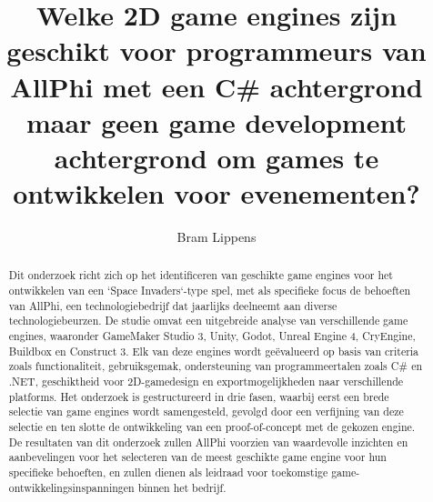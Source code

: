 \documentclass{hogent-article}
\title{Welke 2D game engines zijn geschikt voor programmeurs van AllPhi met een C\# achtergrond maar geen game development achtergrond om games te ontwikkelen voor evenementen?}
\author{Bram Lippens}
\begin{document}
\begin{abstract}
  Dit onderzoek richt zich op het identificeren van geschikte game engines voor het ontwikkelen van een `Space Invaders`-type spel, met als specifieke focus de behoeften van AllPhi, een technologiebedrijf dat jaarlijks deelneemt aan diverse technologiebeurzen. De studie omvat een uitgebreide analyse van verschillende game engines, waaronder GameMaker Studio 3, Unity, Godot, Unreal Engine 4, CryEngine, Buildbox en Construct 3. Elk van deze engines wordt geëvalueerd op basis van criteria zoals functionaliteit, gebruiksgemak, ondersteuning van programmeertalen zoals C\# en .NET, geschiktheid voor 2D-gamedesign en exportmogelijkheden naar verschillende platforms. Het onderzoek is gestructureerd in drie fasen, waarbij eerst een brede selectie van game engines wordt samengesteld, gevolgd door een verfijning van deze selectie en ten slotte de ontwikkeling van een proof-of-concept met de gekozen engine. De resultaten van dit onderzoek zullen AllPhi voorzien van waardevolle inzichten en aanbevelingen voor het selecteren van de meest geschikte game engine voor hun specifieke behoeften, en zullen dienen als leidraad voor toekomstige game-ontwikkelingsinspanningen binnen het bedrijf.
\end{abstract}

\tableofcontents



\printbibliography[heading=bibintoc]
\end{document}
